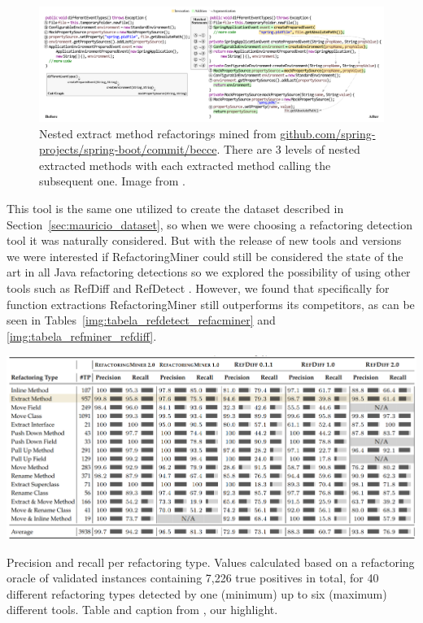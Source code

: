 \begin{figure}[!ht]
\centerline{\includegraphics[width=1.2\textwidth]{figuras/nested_refacs.png}   }
\caption{Nested extract method refactorings mined from \url{github.com/spring-projects/spring-boot/commit/becce}. There
are 3 levels of nested extracted methods with each extracted
method calling the subsequent one. Image from \citet{refactoringminer_2.0}.}
\label{img:nested_refac}
\end{figure}

This tool is the same one utilized to create the dataset described in Section~\ref{sec:mauricio_dataset}, so when we were choosing a refactoring detection tool it was naturally considered. But with the release of new tools and versions we were interested if RefactoringMiner could still be considered the state of the art in all Java refactoring detections so we explored the possibility of using other tools such as RefDiff \citep{silva2020refdiff} and RefDetect \citep{moghadam2021refdetect}. However, we found that specifically for function extractions RefactoringMiner still outperforms its competitors, as can be seen in Tables~\ref{img:tabela_refdetect_refacminer} and \ref{img:tabela_refminer_refdiff}.


\begin{table}[!ht]
\centerline{\includegraphics[width=\textwidth]{figuras/tabela_refminer_refdiff.png}   }
\caption{Precision and recall per refactoring type. Values calculated based on a refactoring
oracle of validated instances containing 7,226 true
positives in total, for 40 different refactoring types detected
by one (minimum) up to six (maximum) different tools. Table  and caption from \citet{refactoringminer_2.0}, our highlight.}
\label{img:tabela_refminer_refdiff}
\end{table}

